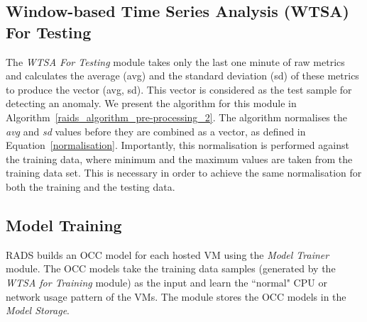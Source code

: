 \subsection{Window-based Time Series Analysis (WTSA) For Testing}
\noindent The \textit{WTSA For Testing} module takes only the last one minute of raw metrics and calculates the average (avg) and the standard deviation (sd) of these metrics to produce the vector (avg, sd). This vector is considered as the test sample for detecting an anomaly. We present the algorithm for this module in Algorithm~\ref{raids_algorithm_pre-processing_2}. The algorithm normalises the \textit{avg} and \textit{sd} values before they are combined as a vector, as defined in Equation~\ref{normalisation}. Importantly, this normalisation is performed against the training data, where minimum and the maximum values are taken from the training data set. 
This is necessary in order to achieve the same normalisation for both the training and the testing data.


\subsection{Model Training}
\noindent RADS builds an OCC model for each hosted VM using the \textit{Model Trainer} module. The OCC models take the training data samples (generated by the \textit{WTSA for Training} module) as the input and learn the ``normal" CPU or network usage pattern of the VMs. 
The module stores the OCC models in the \textit{Model Storage}. 

